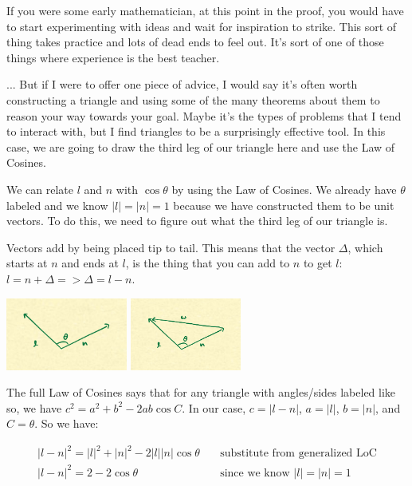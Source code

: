 \documentclass{article}
\begin{document}
If you were some early mathematician, at this point in the proof, you would have to start experimenting with ideas and wait for inspiration to strike.
This sort of thing takes practice and lots of dead ends to feel out.
It's sort of one of those things where experience is the best teacher.

... But if I were to offer one piece of advice, I would say it's often worth constructing a triangle and using some of the many theorems about them to reason your way towards your goal.
Maybe it's the types of problems that I tend to interact with, but I find triangles to be a surprisingly effective tool.
In this case, we are going to draw the third leg of our triangle here and use the Law of Cosines.

We can relate $l$ and $n$ with $\cos \theta$ by using the Law of Cosines.
We already have $\theta$ labeled and we know $|l| = |n| = 1$ because we have constructed them to be unit vectors.
To do this, we need to figure out what the third leg of our triangle is.

Vectors add by being placed tip to tail.
This means that the vector $\Delta$, which starts at $n$ and ends at $l$, is the thing that you can add to $n$ to get $l$: $l = n + \Delta => \Delta = l - n$.

\begin{center}
	\includegraphics[width=0.3\textwidth,frame]{assets/ln.jpg}
	\hspace{0.2\textwidth}
	\includegraphics[width=0.2735\textwidth,frame]{assets/lnw.jpg}
\end{center}

The full Law of Cosines says that for any triangle with angles/sides labeled like so, we have $c^2 = a^2 + b^2 - 2ab \cos C$.
In our case, $c = | l - n |$, $a = |l|$, $b = |n|$, and $C = \theta$.
So we have:

\begin{align*}
|l-n|^2 = |l|^2 + |n|^2 - 2 |l| |n| \cos \theta & \quad \text{substitute from generalized LoC} \\
|l-n|^2 = 2 - 2 \cos \theta & \quad \text{since we know } |l| = |n| = 1
\end{align*}
\end{document}
